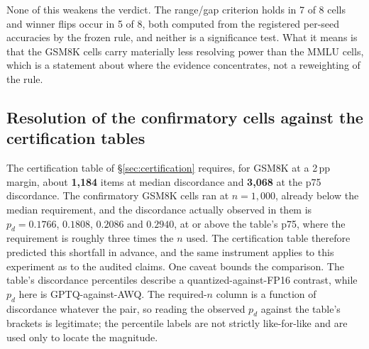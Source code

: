 None of this weakens the verdict. The range/gap criterion holds in 7 of 8 cells
and winner flips occur in 5 of 8, both computed from the registered per-seed
accuracies by the frozen rule, and neither is a significance test. What it means
is that the GSM8K cells carry materially less resolving power than the MMLU
cells, which is a statement about where the evidence concentrates, not a
reweighting of the rule.

\subsection{Resolution of the confirmatory cells against the certification tables}
\label{sec:minigrid:selfaudit}

The certification table of \S\ref{sec:certification} requires, for GSM8K at a
2\,pp margin, about \textbf{1{,}184} items at median discordance and
\textbf{3{,}068} at the p75 discordance. The confirmatory GSM8K cells ran at
$n = 1{,}000$, already below the median requirement, and the discordance
actually observed in them is $p_d = 0.1766$, $0.1808$, $0.2086$ and $0.2940$,
at or above the table's p75, where the requirement is roughly three times the
$n$ used. The certification table therefore predicted this shortfall in advance,
and the same instrument applies to this experiment as to the audited claims.
One caveat bounds the comparison. The table's discordance percentiles describe a
quantized-against-FP16 contrast, while $p_d$ here is GPTQ-against-AWQ. The
required-$n$ column is a function of discordance whatever the pair, so reading
the observed $p_d$ against the table's brackets is legitimate; the percentile
labels are not strictly like-for-like and are used only to locate the magnitude.
